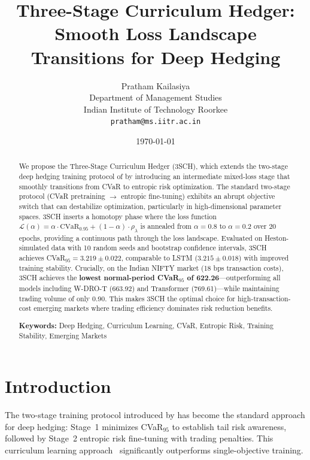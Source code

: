 \documentclass[11pt]{article}
\title{\textbf{Three-Stage Curriculum Hedger: \\Smooth Loss Landscape Transitions for Deep Hedging}}
\author{
Pratham Kailasiya \\
Department of Management Studies \\
Indian Institute of Technology Roorkee \\
\texttt{pratham@ms.iitr.ac.in}
}
\date{\today}
\newcommand{\cvar}{\mathrm{CVaR}}
\begin{document}
\maketitle

\begin{abstract}
We propose the Three-Stage Curriculum Hedger (3SCH), which extends the two-stage deep hedging training protocol of \citet{kozyra2019deep} by introducing an intermediate mixed-loss stage that smoothly transitions from CVaR to entropic risk optimization. The standard two-stage protocol (CVaR pretraining $\to$ entropic fine-tuning) exhibits an abrupt objective switch that can destabilize optimization, particularly in high-dimensional parameter spaces. 3SCH inserts a homotopy phase where the loss function $\mathcal{L}(\alpha) = \alpha \cdot \cvar_{0.95} + (1-\alpha) \cdot \rho_\lambda$ is annealed from $\alpha = 0.8$ to $\alpha = 0.2$ over 20 epochs, providing a continuous path through the loss landscape. Evaluated on Heston-simulated data with 10 random seeds and bootstrap confidence intervals, 3SCH achieves CVaR$_{95} = 3.219 \pm 0.022$, comparable to LSTM ($3.215 \pm 0.018$) with improved training stability. Crucially, on the Indian NIFTY market (18 bps transaction costs), 3SCH achieves the \textbf{lowest normal-period CVaR$_{95}$ of 622.26}---outperforming all models including W-DRO-T (663.92) and Transformer (769.61)---while maintaining trading volume of only 0.90. This makes 3SCH the optimal choice for high-transaction-cost emerging markets where trading efficiency dominates risk reduction benefits.

\smallskip
\noindent\textbf{Keywords:} Deep Hedging, Curriculum Learning, CVaR, Entropic Risk, Training Stability, Emerging Markets
\end{abstract}

\section{Introduction}
\label{sec:intro}

The two-stage training protocol introduced by \citet{kozyra2019deep} has become the standard approach for deep hedging: Stage~1 minimizes CVaR$_{95}$ to establish tail risk awareness, followed by Stage~2 entropic risk fine-tuning with trading penalties. This curriculum learning approach~\citep{bengio2009curriculum} significantly outperforms single-objective training.
\end{document}
